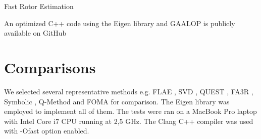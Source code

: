 \documentclass{birkjour}
\numberwithin{equation}{section}
\begin{document}
\begin{algorithm}
\begin{algorithmic}[1]
\ENDFOR
{}
\REPEAT
{}
\end{algorithmic}
\caption{Fast Rotor Estimation}\label{alg:FastRotorEstimation}
\end{algorithm}
An optimized C++ code using the Eigen library \cite{Eigen} and GAALOP  \cite{Gaalop} is publicly available on GitHub \cite{GARotorEstimator}

\section{Comparisons}

We selected several representative methods e.g. FLAE \cite{Wu2017}, SVD \cite{Arun1987}, QUEST \cite{Shuster1981}, FA3R \cite{Wu2018FA3R}, Symbolic \cite{Wu2018FS3R}, Q-Method \cite{Shuster1981} and FOMA \cite{Markley1993} for comparison. The Eigen library \cite{Eigen} was employed to implement all of them. The tests were ran on a MacBook Pro laptop with Intel Core i7 CPU running at 2,5 GHz. The Clang C++ compiler was used with -Ofast option enabled.
\end{document}
